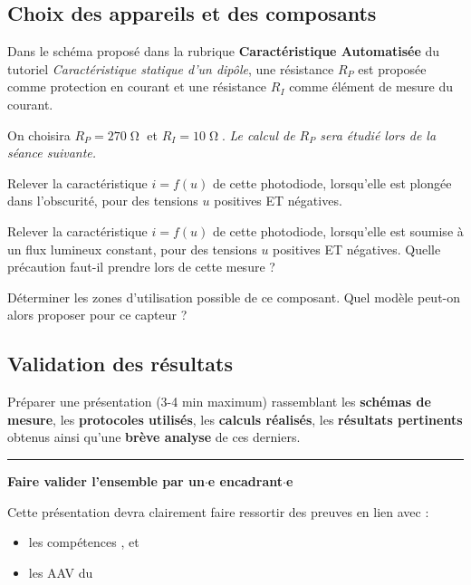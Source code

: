 \subsection{Choix des appareils et des composants}

Dans le schéma proposé dans la rubrique \textbf{Caractéristique Automatisée} du tutoriel \textit{Caractéristique statique d'un dipôle}, une résistance $R_P$ est proposée comme protection en courant et une résistance $R_I$ comme élément de mesure du courant.

On choisira $R_P = 270\operatorname{\Omega}$ et $R_I = 10\operatorname{\Omega}$. \textit{Le calcul de $R_P$ sera étudié lors de la séance suivante.}

\Manip Relever la caractéristique $i=f(u)$ de cette photodiode, lorsqu'elle est plongée dans l'obscurité, pour des tensions $u$ positives ET négatives.

\Manip Relever la caractéristique $i=f(u)$ de cette photodiode, lorsqu'elle est soumise à un flux lumineux constant, pour des tensions $u$ positives ET négatives. Quelle précaution faut-il prendre lors de cette mesure ?

\Manip Déterminer les zones d'utilisation possible de ce composant. Quel modèle peut-on alors proposer pour ce capteur ? 

\subsection{Validation des résultats}

\Real Préparer une présentation (3-4 min maximum) rassemblant les \textbf{schémas de mesure}, les \textbf{protocoles utilisés}, les \textbf{calculs réalisés}, les \textbf{résultats pertinents} obtenus ainsi qu'une \textbf{brève analyse} de ces derniers.

\medskip

\noindent \rule{\linewidth}{1pt}

\textbf{\Large Faire valider l'ensemble par un$\cdot$e encadrant$\cdot$e}

\medskip

Cette présentation devra clairement faire ressortir des preuves en lien avec :

\begin{itemize}
	\item les compétences ,  et 
	\item les AAV du 
\end{itemize}



